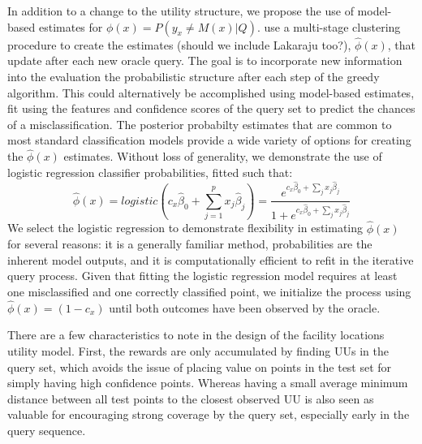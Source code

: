 \documentclass[letterpaper]{article} %
\newcommand{\km}[1]{{\color{red} #1}} %
\newcommand{\wdb}[1]{{\color{blue} #1}} %
\begin{document}
In addition to a change to the utility structure, we propose the use of model-based estimates for $\phi(x) = P\left(y_x \neq M(x) |Q \right)$. \citet{Bansal2018} use a multi-stage clustering procedure to create the estimates \wdb{(should we include Lakaraju too?)}, $\hat{\phi}(x)$, that update after each new oracle query. The goal is to incorporate new information into the evaluation the probabilistic structure after each step of the greedy algorithm. This could alternatively be accomplished using model-based estimates, fit using the features and confidence scores of the query set to predict the chances of a misclassification. The posterior probabilty estimates that are common to most standard classification models provide a wide variety of options for creating the $\hat{\phi}(x)$ estimates. Without loss of generality, we demonstrate the use of logistic regression classifier probabilities, fitted such that:
$$\hat{\phi}(x) = logistic(c_x\hat{\beta}_0 + \sum_{j=1}^p x_j\hat{\beta}_j) = \frac{e^{c_x\hat{\beta}_0 + \sum_j x_j\hat{\beta}_j}}{1+e^{c_x\hat{\beta}_0 + \sum_j x_j\hat{\beta}_j}}$$
We select the logistic regression to demonstrate flexibility in estimating $\hat{\phi}(x)$ for several reasons: it is a generally familiar method, probabilities are the inherent model outputs, and it is computationally efficient to refit in the iterative query process. \km{Given that fitting the logistic regression model requires at least one misclassified and one correctly classified point, we initialize the process using $\hat{\phi}(x) =(1-c_x)$ until both outcomes have been observed by the oracle.}

There are a few characteristics to note in the design of the facility locations utility model. First, the rewards are only accumulated by finding UUs in the query set, which avoids the issue of placing value on points in the test set for simply having high confidence points. Whereas having a small average minimum distance between all test points to the closest observed UU is also seen as valuable for encouraging strong coverage by the query set, especially early in the query sequence. 
\end{document}
